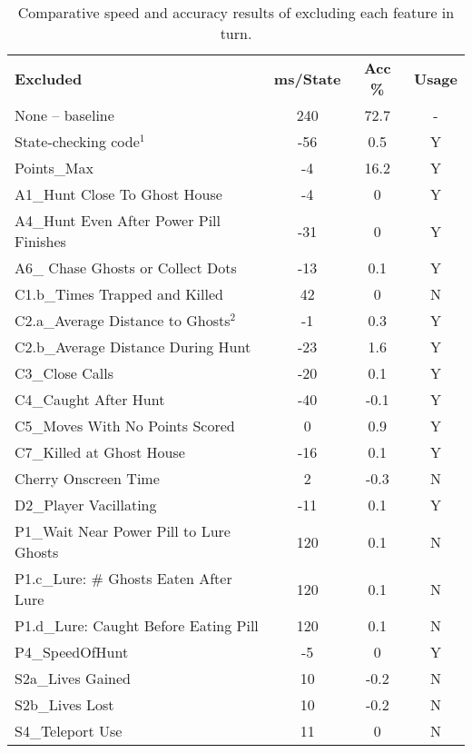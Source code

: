 \documentclass[conference]{IEEEtran}
\begin{document}
\begin{table}[ht]
	\centering
	\caption{Comparative speed and accuracy results of excluding each feature in turn.}
	\label{table:loo}
	\begin{tabular}{lccc}
		\textbf{Excluded} & \textbf{ms/State} & \textbf{Acc \%} & \textbf{Usage} \\
		None – baseline                         & 240 & 72.7 & -\\
		State-checking code$^1$                 & -56 & 0.5 & Y \\
		Points\_Max                             & -4 & 16.2 & Y \\
		A1\_Hunt Close To Ghost House           & -4 & 0 & Y \\
		A4\_Hunt Even After Power Pill Finishes & -31 & 0 & Y \\
		A6\_ Chase Ghosts or Collect Dots       & -13 & 0.1 & Y \\
		C1.b\_Times Trapped and Killed          & 42 & 0 & N \\
		C2.a\_Average Distance to Ghosts$^2$    & -1 & 0.3 & Y \\
		C2.b\_Average Distance During Hunt      & -23 & 1.6 & Y \\
		C3\_Close Calls                         & -20 & 0.1 & Y \\
		C4\_Caught After Hunt                   & -40 & -0.1 & Y \\
		C5\_Moves With No Points Scored         & 0 & 0.9 & Y \\
		C7\_Killed at Ghost House               & -16 & 0.1 & Y \\
		Cherry Onscreen Time                    & 2 & -0.3 & N \\
		D2\_Player Vacillating                  & -11 & 0.1 & Y \\
		P1\_Wait Near Power Pill to Lure Ghosts & 120 & 0.1 & N \\
		P1.c\_Lure: \# Ghosts Eaten After Lure  & 120 & 0.1 & N \\
		P1.d\_Lure: Caught Before Eating Pill   & 120 & 0.1 & N \\
		P4\_SpeedOfHunt                         & -5 & 0 & Y \\
		S2a\_Lives Gained                       & 10 & -0.2 & N \\
		S2b\_Lives Lost                         & 10 & -0.2 & N \\
		S4\_Teleport Use                        & 11 & 0 & N
	\end{tabular}
\end{table}
\end{document}
